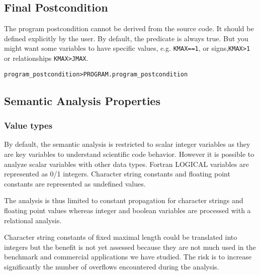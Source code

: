 \documentclass[a4paper]{report}
\newenvironment{PipsMake}{\begin{alltt}}{\end{alltt}}
\begin{document}
\subsection{Final Postcondition}
\label{subsubsection-final-postcondition}

The program postcondition cannot be derived from the source code. It
should be defined explicitly by the user. By default, the predicate is
always true. But you might want some variables to have specific values,
e.g. \verb+KMAX==1+, or signs,\verb+KMAX>1+ or relationships
\verb+KMAX>JMAX+.

\begin{PipsMake}
program_postcondition     > PROGRAM.program_postcondition
\end{PipsMake}

\subsection{Semantic Analysis Properties}
\label{subsection-semantic-analysis}

\subsubsection{Value types}

By default, the semantic analysis is restricted to scalar integer
variables as they are key variables to understand scientific code
behavior. However it is possible to analyze scalar variables with other
data types. Fortran LOGICAL variables are represented as 0/1
integers. Character string constants and floating point constants are
represented as undefined values.

The analysis is thus limited to constant propagation for character strings
and floating point values whereas integer and boolean variables are
processed with a relational analysis.

Character string constants of fixed maximal length could be translated
into integers but the benefit is not yet assessed because they are not
much used in the benchmark and commercial applications we have studied.
The risk is to increase significantly the number of overflows encountered
during the analysis.
\end{document}
